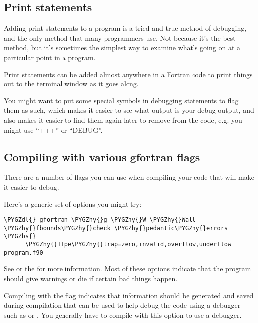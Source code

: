 \documentclass[letterpaper,10pt,english]{sphinxmanual}
\def\PYGZbs{\char`\\}
\def\PYGZdl{\char`\$}
\def\PYGZhy{\char`\-}
\begin{document}
\subsection{Print statements}
\label{fortran_debugging:print-statements}
Adding print statements to a program is a tried and true method of
debugging, and the only method that many programmers use.
Not because it's the best method, but it's sometimes the simplest way to
examine what's going on at a particular point in a program.

Print statements can be added almost anywhere in a Fortran code to print
things out to the terminal window as it goes along.

You might want to put some special symbols in debugging statements to flag
them as such, which makes it easier to see what output is your debug output,
and also makes it easier to find them again later to remove from the code,
e.g. you might use ``+++'' or ``DEBUG''.


\subsection{Compiling with various gfortran flags}
\label{fortran_debugging:compiling-with-various-gfortran-flags}
There are a number of flags you can use when compiling your code that will
make it easier to debug.

Here's a generic set of options you might try:

\begin{Verbatim}[commandchars=\\\{\}]
\PYGZdl{} gfortran \PYGZhy{}g \PYGZhy{}W \PYGZhy{}Wall \PYGZhy{}fbounds\PYGZhy{}check \PYGZhy{}pedantic\PYGZhy{}errors \PYGZbs{}
      \PYGZhy{}ffpe\PYGZhy{}trap=zero,invalid,overflow,underflow  program.f90
\end{Verbatim}

See {\hyperref[gfortran_flags:gfortran\string-flags]{}} or the
for more information.  Most of these options
indicate that the program should give warnings or die if certain bad things
happen.

Compiling with the  flag indicates that information should be
generated and saved during compilation that can be used to help debug the
code using a debugger such as  or .  You generally have to
compile with this option to use a debugger.
\end{document}
